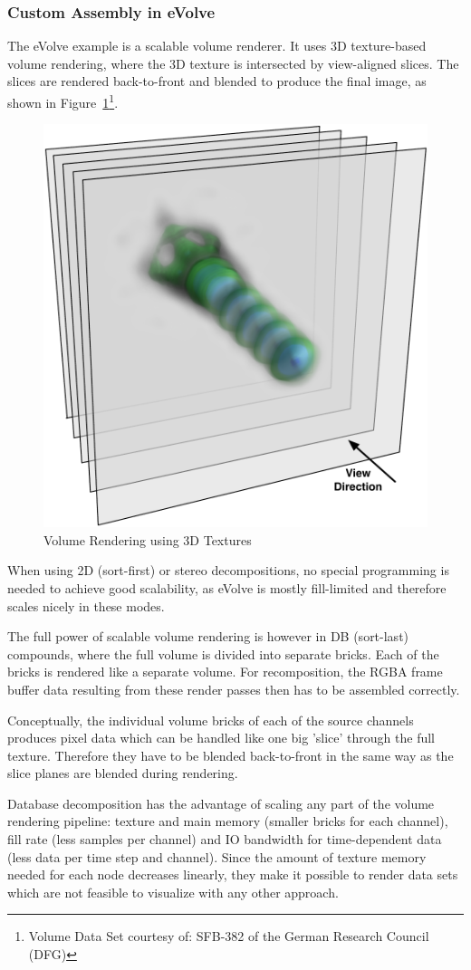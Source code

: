 \documentclass[10pt,a4]{scrartcl}
\newcommand{\fig}[1]{Figure~\ref{#1}}
\begin{document}
\subsubsection{Custom Assembly in eVolve}

The \textsf{eVolve} example is a scalable volume renderer. It uses 3D
texture-based volume rendering, where the 3D texture is intersected by
view-aligned slices. The slices are rendered back-to-front and blended
to produce the final image, as shown in \fig{fSlices}\footnote{Volume
  Data Set courtesy of: SFB-382 of the German Research Council (DFG)}.

\begin{figure}
  \includegraphics[width=.382\textwidth]{images/slices.pdf}
  {\caption{\label{fSlices}Volume Rendering using 3D Textures}}
\end{figure}
When using 2D (sort-first) or stereo decompositions, no special
programming is needed to achieve good scalability, as \textsf{eVolve} is
mostly fill-limited and therefore scales nicely in these modes. 

The full power of scalable volume rendering is however in DB (sort-last)
compounds, where the full volume is divided into separate bricks. Each
of the bricks is rendered like a separate volume. For recomposition, the
\textsf{RGBA} frame buffer data resulting from these render passes then
has to be assembled correctly. 

Conceptually, the individual volume bricks of each of the source
channels produces pixel data which can be handled like one big 'slice'
through the full texture. Therefore they have to be blen\-ded
back-to-front in the same way as the slice planes are blended during
rendering.

Database decomposition has the advantage of scaling any part of the volume
rendering pipeline: texture and main memory (smaller bricks for each channel),
fill rate (less samples per channel) and IO bandwidth for time-dependent data
(less data per time step and channel). Since the amount of texture memory needed
for each node decreases linearly, they make it possible to render data sets
which are not feasible to visualize with any other approach.
\end{document}
